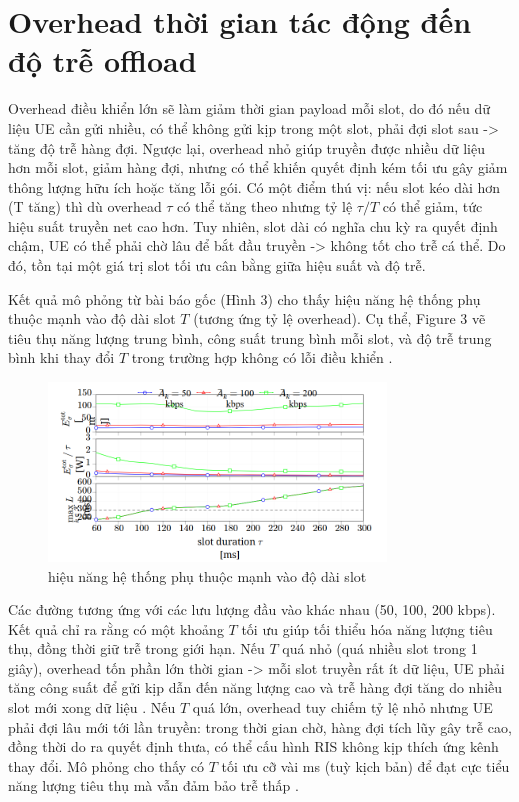 \section{Overhead thời gian tác động đến độ trễ offload}


Overhead điều khiển lớn sẽ làm giảm thời gian payload mỗi slot, do đó nếu dữ liệu UE cần gửi nhiều, có thể không gửi kịp trong một slot, phải đợi slot sau -> tăng độ trễ hàng đợi. Ngược lại, overhead nhỏ giúp truyền được nhiều dữ liệu hơn mỗi slot, giảm hàng đợi, nhưng có thể khiến quyết định kém tối ưu gây giảm thông lượng hữu ích hoặc tăng lỗi gói. Có một điểm thú vị: nếu slot kéo dài hơn (T tăng) thì dù overhead $\tau$ có thể tăng theo nhưng tỷ lệ $\tau/T$ có thể giảm, tức hiệu suất truyền net cao hơn. Tuy nhiên, slot dài có nghĩa chu kỳ ra quyết định chậm, UE có thể phải chờ lâu để bắt đầu truyền -> không tốt cho trễ cá thể. Do đó, tồn tại một giá trị slot tối ưu cân bằng giữa hiệu suất và độ trễ.


Kết quả mô phỏng từ bài báo gốc (Hình 3) cho thấy hiệu năng hệ thống phụ thuộc mạnh vào độ dài slot $T$ (tương ứng tỷ lệ overhead). Cụ thể, Figure 3 vẽ tiêu thụ năng lượng trung bình, công suất trung bình mỗi slot, và độ trễ trung bình khi thay đổi $T$ trong trường hợp không có lỗi điều khiển .

\begin{figure}[H]
  \centering
  \includegraphics[width=0.8\textwidth]{images/f3.png}
  \caption{hiệu năng hệ thống phụ thuộc mạnh vào độ dài slot}
    \label{fig:my-image}
\end{figure}

Các đường tương ứng với các lưu lượng đầu vào khác nhau (50, 100, 200 kbps). Kết quả chỉ ra rằng có một khoảng $T$ tối ưu giúp tối thiểu hóa năng lượng tiêu thụ, đồng thời giữ trễ trong giới hạn. Nếu $T$ quá nhỏ (quá nhiều slot trong 1 giây), overhead tốn phần lớn thời gian -> mỗi slot truyền rất ít dữ liệu, UE phải tăng công suất để gửi kịp dẫn đến năng lượng cao và trễ hàng đợi tăng do nhiều slot mới xong dữ liệu . Nếu $T$ quá lớn, overhead tuy chiếm tỷ lệ nhỏ nhưng UE phải đợi lâu mới tới lần truyền: trong thời gian chờ, hàng đợi tích lũy gây trễ cao, đồng thời do ra quyết định thưa, có thể cấu hình RIS không kịp thích ứng kênh thay đổi. Mô phỏng cho thấy có $T$ tối ưu cỡ vài ms (tuỳ kịch bản) để đạt cực tiểu năng lượng tiêu thụ mà vẫn đảm bảo trễ thấp .


